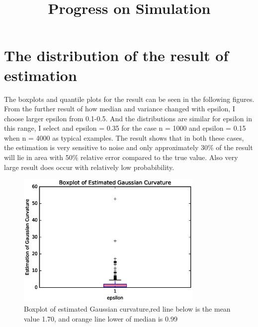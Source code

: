 \documentclass{article}
\title{Progress on Simulation}
\author{}
\date{}
\begin{document}
\maketitle

\section{The distribution of the result of estimation}
The boxplots and quantile plots for the result can be seen in the following figures. From the further result of how median and variance changed with epsilon, I choose larger epsilon from 0.1-0.5. And the distributions are similar for epsilon in this range, I select and  epsilon = 0.35 for the case n = 1000 and epsilon = 0.15 when n = 4000 as typical examples. The result shows that in both these cases, the estimation is very sensitive to noise and only approximately 30\% of the result will lie in area with 50\% relative error compared to the true value. Also very large result does occur with relatively low probabibility. 
\begin{figure}[htbp]
\centering
\includegraphics[width=0.8\textwidth]{Boxplot-size-1000-epsilon-35.eps}
\caption{Boxplot of estimated Gaussian curvature,red line below is the mean value 1.70, and orange line lower of median is 0.99}
\label{bp1000}
\end{figure}
\end{document}

